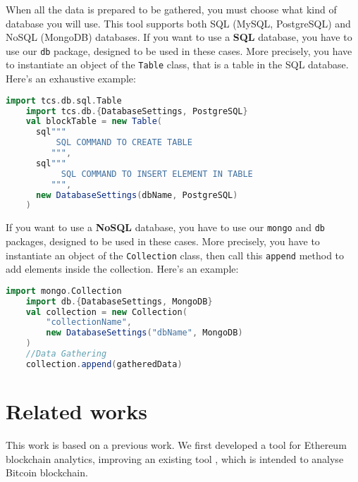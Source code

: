 When all the data is prepared to be gathered, you must choose what kind of database you will use. This tool supports both SQL (MySQL, PostgreSQL) and NoSQL (MongoDB) databases.
If you want to use a \textbf{SQL} database, you have to use our \texttt{db} package, designed to be used in these cases. More precisely, you have to instantiate an object of the \texttt{Table} class, that is a table in the SQL database. 
\newline
Here's an exhaustive example:
\begin{lstlisting}[language=Scala]
    import tcs.db.sql.Table
    import tcs.db.{DatabaseSettings, PostgreSQL}
    val blockTable = new Table(
      sql"""
          SQL COMMAND TO CREATE TABLE
         """,
      sql"""
           SQL COMMAND TO INSERT ELEMENT IN TABLE
         """,
      new DatabaseSettings(dbName, PostgreSQL)
    )
\end{lstlisting}
If you want to use a \textbf{NoSQL} database, you have to use our \texttt{mongo} and \texttt{db} packages, designed to be used in these cases. More precisely, you have to instantiate an object of the \texttt{Collection} class, then call this \texttt{append} method to add elements inside the collection. 
\newline
Here's an example:
\begin{lstlisting}[language=Scala]
    import mongo.Collection
    import db.{DatabaseSettings, MongoDB}
    val collection = new Collection(
        "collectionName", 
        new DatabaseSettings("dbName", MongoDB)
    )
    //Data Gathering
    collection.append(gatheredData)
\end{lstlisting}

\section{Related works}
This work is based on a previous work. We first developed a tool for Ethereum blockchain analytics, improving an existing tool \cite{bartoletti2017generalbit,bartoletti2017generalblock}, which is intended to analyse Bitcoin blockchain.